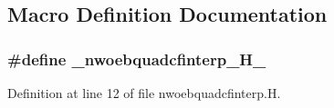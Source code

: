 \subsection{Macro Definition Documentation}
\subsubsection[{\texorpdfstring{\+\_\+nwoebquadcfinterp\+\_\+\+H\+\_\+}{_nwoebquadcfinterp_H_}}]{\setlength{\rightskip}{0pt plus 5cm}\#define \+\_\+nwoebquadcfinterp\+\_\+\+H\+\_\+}\hypertarget{nwoebquadcfinterp_8H_a32123da7c11c3e63c4a0504ef9f0b0e0}{}\label{nwoebquadcfinterp_8H_a32123da7c11c3e63c4a0504ef9f0b0e0}


Definition at line 12 of file nwoebquadcfinterp.\+H.

